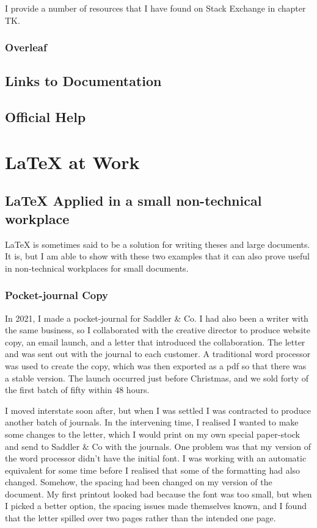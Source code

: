\documentclass[11pt, oneside]{memoir}
\begin{document}
I provide a number of resources that I have found on Stack Exchange in chapter TK.

\subsection{Overleaf}

\section{Links to Documentation}

\section{Official Help}

\chapter{\LaTeX{} at Work}

\section{\LaTeX{} Applied in a small non-technical workplace}
\LaTeX{} is sometimes said to be a solution for writing theses and large documents. It is, but I am able to show with these two examples that it can also prove useful in non-technical workplaces for small documents.

\subsection{Pocket-journal Copy}
In 2021, I made a pocket-journal for Saddler \& Co. I had also been a writer with the same business, so I collaborated with the creative director to produce website copy, an email launch, and a letter that introduced the collaboration. The letter and was sent out with the journal to each customer. A traditional word processor was used to create the copy, which was then exported as a pdf so that there was a stable version. The launch occurred just before Christmas, and we sold forty of the first batch of fifty within 48 hours.

I moved interstate soon after, but when I was settled I was contracted to produce another batch of journals. In the intervening time, I realised I wanted to make some changes to the letter, which I would print on my own special paper-stock and send to Saddler \& Co with the journals. One problem was that my version of the word processor didn't have the initial font. I was working with an automatic equivalent for some time before I realised that some of the formatting had also changed. Somehow, the spacing had been changed on my version of the document. My first printout looked bad because the font was too small, but when I picked a better option, the spacing issues made themselves known, and I found that the letter spilled over two pages rather than the intended one page.
\end{document}

